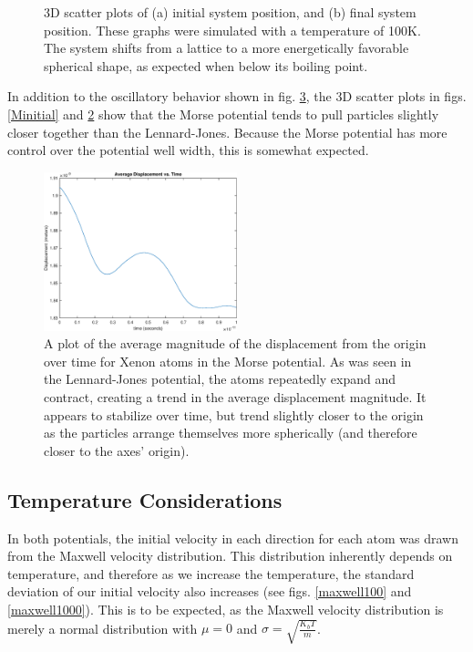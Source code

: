 \documentclass[12pt]{article}
\begin{document}
\begin{figure}[!h]
\begin{subfigure}{0.5\textwidth}
\caption{\label{Mfinal}}
\end{subfigure}
\caption{3D scatter plots of (a) initial system position, and (b) final system position.  These graphs were simulated with a temperature of 100K.  The system shifts from a lattice to a more energetically favorable spherical shape, as expected when below its boiling point.} 
\end{figure}

In addition to the oscillatory behavior shown in fig. \ref{Maverager}, the 3D scatter plots in figs. \ref{Minitial} and \ref{Mfinal} show that the Morse potential tends to pull particles slightly closer together than the Lennard-Jones.  Because the Morse potential has more control over the potential well width, this is somewhat expected.

\begin{figure}
\begin{center}
\includegraphics[width=0.5\textwidth]{./finalpics/Maverager.eps}
\caption{\label{Maverager} A plot of the average magnitude of the displacement from the origin over time for Xenon atoms in the Morse potential.  As was seen in the Lennard-Jones potential, the atoms repeatedly expand and contract, creating a trend in the average displacement magnitude.  It appears to stabilize over time, but trend slightly closer to the origin as the particles arrange themselves more spherically (and therefore closer to the axes' origin).}
\end{center}
\end{figure}
\subsection*{Temperature Considerations}
In both potentials, the initial velocity in each direction for each atom was drawn from the Maxwell velocity distribution.  This distribution inherently depends on temperature, and therefore as we increase the temperature, the standard deviation of our initial velocity also increases (see figs. \ref{maxwell100} and \ref{maxwell1000}).  This is to be expected, as the Maxwell velocity distribution is merely a normal distribution with $\mu = 0$ and $\sigma = \sqrt{\frac{K_bT}{m}}$.
\end{document}
